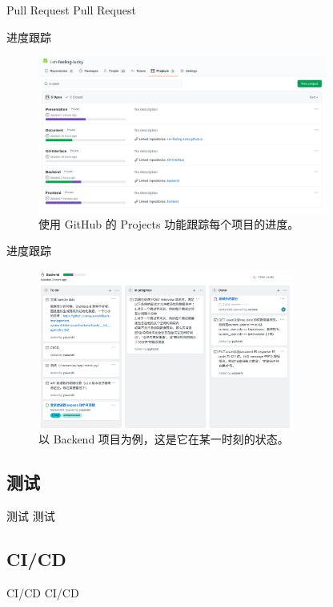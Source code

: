 \documentclass[aspectratio=169,10pt]{beamer}
\begin{document}
\begin{frame}{Pull Request}
  Pull Request
\end{frame}

\begin{frame}{进度跟踪}
  \begin{figure}
    \includegraphics[width=0.85\textwidth]{../images/all-projects-wip.png}
    \caption{使用 GitHub 的 Projects 功能跟踪每个项目的进度。}
  \end{figure}
\end{frame}

\begin{frame}{进度跟踪}
  \begin{figure}
    \includegraphics[width=0.75\textwidth]{../images/backend-project-wip.png}
    \caption{以 Backend 项目为例，这是它在某一时刻的状态。}
  \end{figure}
\end{frame}

\subsection{测试}
\begin{frame}{测试}
  测试
\end{frame}

\subsection{CI/CD}
\begin{frame}{CI/CD}
  CI/CD
\end{frame}
\end{document}
